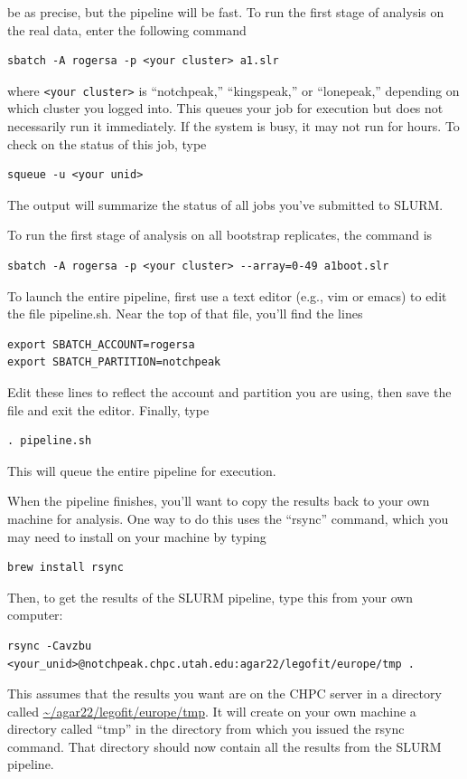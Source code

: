 \documentclass[11pt]{article}
\begin{document}
be as precise, but the pipeline will be fast. To run the first stage
of analysis on the real data, enter the following command
\begin{verbatim}
sbatch -A rogersa -p <your cluster> a1.slr
\end{verbatim}
where \verb|<your cluster>| is ``notchpeak,'' ``kingspeak,'' or
``lonepeak,'' depending on which cluster you logged into.
This queues your job for execution but does not necessarily run it
immediately. If the system is busy, it may not run for hours. To check
on the status of this job, type
\begin{verbatim}
squeue -u <your unid>
\end{verbatim}
The output will summarize the status of all jobs you've submitted to
SLURM.

To run the first stage of analysis on all bootstrap replicates, the
command is
\begin{verbatim}
sbatch -A rogersa -p <your cluster> --array=0-49 a1boot.slr
\end{verbatim}

To launch the entire pipeline, first use a text editor (e.g., vim or
emacs) to edit the file pipeline.sh. Near the top of that file, you'll
find the lines
\begin{verbatim}
export SBATCH_ACCOUNT=rogersa
export SBATCH_PARTITION=notchpeak
\end{verbatim}
Edit these lines to reflect the account and partition you are using,
then save the file and exit the editor. Finally, type
\begin{verbatim}
. pipeline.sh
\end{verbatim}
This will queue the entire pipeline for execution.

When the pipeline finishes, you'll want to copy the results back to
your own machine for analysis. One way to do this uses the
``rsync'' command, which you may need to install on your machine by
typing
\begin{verbatim}
brew install rsync
\end{verbatim}
Then, to get the results of the SLURM pipeline, type this from your
own computer:
\begin{verbatim}
rsync -Cavzbu <your_unid>@notchpeak.chpc.utah.edu:agar22/legofit/europe/tmp .
\end{verbatim}
This assumes that the results you want are on the CHPC server in a
directory called \url{~/agar22/legofit/europe/tmp}. It will create on
your own machine a directory called ``tmp'' in the directory from
which you issued the rsync command. That directory should now contain
all the results from the SLURM pipeline.
\end{document}
